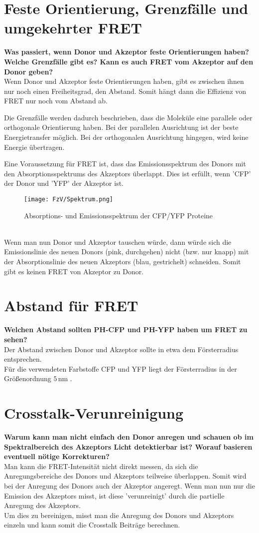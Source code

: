 \section{Feste Orientierung, Grenzfälle und umgekehrter FRET}
\textbf{Was passiert, wenn Donor und Akzeptor feste Orientierungen haben? Welche Grenzfälle gibt es? Kann es auch FRET vom Akzeptor auf den Donor geben?}\\
Wenn Donor und Akzeptor feste Orientierungen haben, gibt es zwischen ihnen nur noch einen Freiheitsgrad, den Abstand.
Somit hängt dann die Effizienz von FRET nur noch vom Abstand ab.\newline

Die Grenzfälle werden dadurch beschrieben, dass die Moleküle eine parallele oder orthogonale Orientierung haben.
Bei der parallelen Ausrichtung ist der beste Energietransfer möglich.
Bei der orthogonalen Ausrichtung hingegen, wird keine Energie übertragen.\newline

Eine Voraussetzung für FRET ist, dass das Emissionsspektrum des Donors mit den Absorptionsspektrums des Akzeptors überlappt.
Dies ist erfüllt, wenn 'CFP' der Donor und 'YFP' der Akzeptor ist.
\begin{figure}[h]
    \centering\texttt{[image: FzV/Spektrum.png]}
    \caption{Absorptions- und Emissionsspektrum der CFP/YFP Proteine}
\end{figure}\\
Wenn man nun Donor und Akzeptor tauschen würde, dann würde sich die Emissionslinie des neuen Donors (pink, durchgehen) nicht (bzw. nur knapp) mit der Absorptionslinie des neuen Akzeptors (blau, gestrichelt) schneiden.
Somit gibt es keinen FRET von Akzeptor zu Donor.
\section{Abstand für FRET}
\textbf{Welchen Abstand sollten PH-CFP und PH-YFP haben um FRET zu sehen?}\\
Der Abstand zwischen Donor und Akzeptor sollte in etwa dem Försterradius entsprechen.\\
Für die verwendeten Farbstoffe CFP und YFP liegt der Försterradius in der Größenordnung $5\,\text{nm}$ \citep[vgl.][]{foersterradius}.
\section{Crosstalk-Verunreinigung}
\textbf{Warum kann man nicht einfach den Donor anregen und schauen ob im Spektralbereich des Akzeptors Licht detektierbar ist? Worauf basieren eventuell nötige Korrekturen?}\\
Man kann die FRET-Intensität nicht direkt messen, da sich die Anregungsbereiche des Donors und Akzeptors teilweise überlappen.
Somit wird bei der Anregung des Donors auch der Akzeptor angeregt.
Wenn man nun nur die Emission des Akzeptors misst, ist diese 'verunreinigt' durch die partielle Anregung des Akzeptors.\\

Um dies zu bereinigen, misst man die Anregung des Donors und Akzeptors einzeln und kann somit die Crosstalk Beiträge berechnen.\newpage
